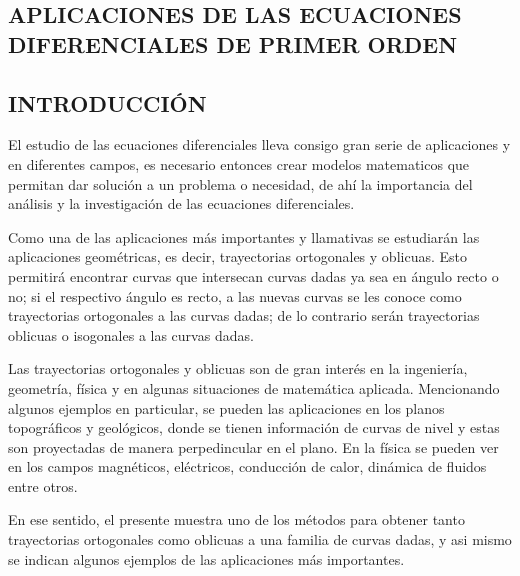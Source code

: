 \documentclass[12pt,letterpaper]{article}
\begin{document}
\begin{titlepage}



\section{\Large APLICACIONES DE LAS ECUACIONES DIFERENCIALES DE PRIMER ORDEN}

\vspace{1cm}

\subsection{\normalsize { INTRODUCCIÓN}}
\justify
El estudio de las ecuaciones diferenciales lleva consigo gran serie de aplicaciones y en diferentes campos, es necesario entonces crear modelos matematicos que permitan dar solución a un problema o necesidad, de ahí la importancia del análisis y la investigación de las ecuaciones diferenciales. 

Como una de las aplicaciones más importantes y llamativas se estudiarán las aplicaciones geométricas, es decir, trayectorias ortogonales y oblicuas. Esto permitirá encontrar curvas que intersecan curvas dadas ya sea en ángulo recto o no; si el respectivo ángulo es recto, a las nuevas curvas se les conoce como trayectorias ortogonales a las curvas dadas; de lo contrario serán trayectorias oblicuas o isogonales a las curvas dadas.

Las trayectorias ortogonales y oblicuas son de gran interés en la ingeniería, geometría, física y en algunas situaciones de matemática aplicada. Mencionando algunos ejemplos en particular, se pueden las aplicaciones en los planos topográficos y geológicos, donde se tienen información de curvas de nivel y estas son proyectadas de manera perpedincular en el plano. En la física se pueden ver en los campos magnéticos, eléctricos, conducción de calor, dinámica de fluidos entre otros.

En ese sentido, el presente muestra uno de los métodos para obtener tanto trayectorias ortogonales como oblicuas a una familia de curvas dadas, y asi mismo se indican algunos ejemplos de las aplicaciones más importantes.



\end{titlepage}
\end{document}
